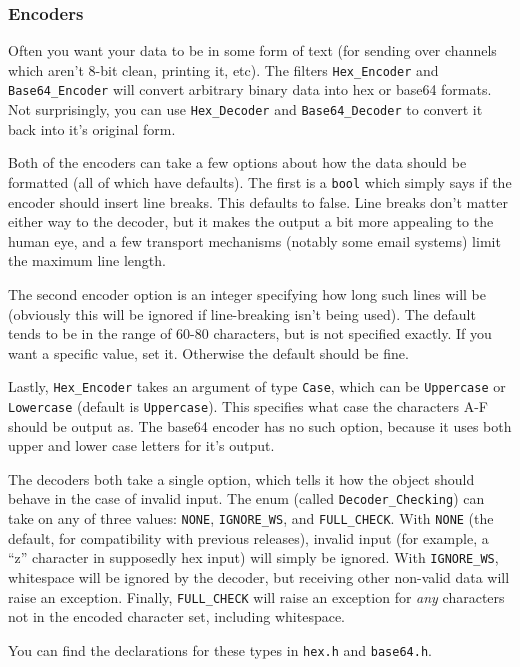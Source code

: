 \documentclass{article}
\newcommand{\filename}[1]{\texttt{#1}}
\newcommand{\type}[1]{\texttt{#1}}
\begin{document}
\subsubsection{Encoders}

Often you want your data to be in some form of text (for sending over channels
which aren't 8-bit clean, printing it, etc). The filters \type{Hex\_Encoder}
and \type{Base64\_Encoder} will convert arbitrary binary data into hex or
base64 formats. Not surprisingly, you can use \type{Hex\_Decoder} and
\type{Base64\_Decoder} to convert it back into it's original form.

Both of the encoders can take a few options about how the data should be
formatted (all of which have defaults). The first is a \type{bool} which simply
says if the encoder should insert line breaks. This defaults to
false. Line breaks don't matter either way to the decoder, but it makes the
output a bit more appealing to the human eye, and a few transport mechanisms
(notably some email systems) limit the maximum line length.

The second encoder option is an integer specifying how long such lines will be
(obviously this will be ignored if line-breaking isn't being used). The default
tends to be in the range of 60-80 characters, but is not specified exactly. If
you want a specific value, set it. Otherwise the default should be fine.

Lastly, \type{Hex\_Encoder} takes an argument of type \type{Case}, which can be
\type{Uppercase} or \type{Lowercase} (default is \type{Uppercase}). This
specifies what case the characters A-F should be output as. The base64 encoder
has no such option, because it uses both upper and lower case letters for it's
output.

The decoders both take a single option, which tells it how the object should
behave in the case of invalid input. The enum (called \type{Decoder\_Checking})
can take on any of three values: \type{NONE}, \type{IGNORE\_WS}, and
\type{FULL\_CHECK}. With \type{NONE} (the default, for compatibility with
previous releases), invalid input (for example, a ``z'' character in supposedly
hex input) will simply be ignored. With \type{IGNORE\_WS}, whitespace will be
ignored by the decoder, but receiving other non-valid data will raise an
exception. Finally, \type{FULL\_CHECK} will raise an exception for \emph{any}
characters not in the encoded character set, including whitespace.

You can find the declarations for these types in \filename{hex.h} and
\filename{base64.h}.
\end{document}
